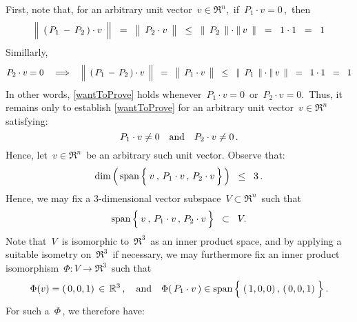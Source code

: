 First, note that, for an arbitrary unit vector \,$v \in \Re^{n}$,\,
if \,$P_{1} \cdot v = 0$\,,\, then
\begin{equation*}
\left\Vert\;\, (\,P_{1} \,\overset{{\color{white}.}}{-}\, P_{2}\,)\cdot v \,\;\right\Vert
\;\; = \;\;
	\left\Vert\;\, P_{2} \overset{{\color{white}.}}{\cdot} v \,\;\right\Vert
\;\; \leq \;\;
	\left\Vert\;\, P_{2} \,\;\right\Vert
	\cdot
	\left\Vert\, v \,\;\right\Vert
\;\; = \;\;
	1 \cdot 1
\;\; = \;\;
	1
\end{equation*}
Simillarly,
\begin{equation*}
P_{2} \cdot v = 0
\quad\Longrightarrow\quad
\left\Vert\;\, (\,P_{1} \,\overset{{\color{white}.}}{-}\, P_{2}\,)\cdot v \,\;\right\Vert
\;\; = \;\;
	\left\Vert\;\, P_{1} \overset{{\color{white}.}}{\cdot} v \,\;\right\Vert
\;\; \leq \;\;
	\left\Vert\;\, P_{1} \,\;\right\Vert
	\cdot
	\left\Vert\, v \,\;\right\Vert
\;\; = \;\;
	1 \cdot 1
\;\; = \;\;
	1
\end{equation*}
In other words, \eqref{wantToProve} holds whenever
\,$P_{1}\cdot v = 0$\, or \,$P_{2}\cdot v = 0$.\,
Thus, it remains only to establish \eqref{wantToProve}
for an arbitrary unit vector \,$v \in \Re^{n}$\, satisfying:
\begin{equation}\label{caseAssumption}
P_{1} \cdot v \neq 0
\quad\textnormal{and}\quad
P_{2} \cdot v \neq 0\,.
\end{equation}
Hence, let \,$v \in \Re^{n}$\, be an arbitrary such unit vector.
Observe that:
\begin{equation*}
\dim\left(\,\span\left\{\,\overset{{\color{white}-}}{v} \,,\, P_{1}\cdot v \,,\, P_{2}\cdot v\,\right\}\,\right)
\;\; \leq \;\;
	3\,.
\end{equation*}
Hence, we may fix a $3$-dimensional vector subspace \,$V \subset \Re^{n}$\, such that
\begin{equation*}
\span\left\{\,\overset{{\color{white}-}}{v} \,,\, P_{1}\cdot v \,,\, P_{2}\cdot v\,\right\}
\;\; \subset \;\;
	V.
\end{equation*}
Note that \,$V$\, is isomorphic to \,$\Re^{3}$\, as an inner product space,
and by applying a suitable isometry on \,$\Re^{3}$\, if necessary,
we may furthermore fix an inner product isomorphism \,$\Phi : V \longrightarrow \Re^{3}$\,
such that
\begin{equation*}
\Phi(v) = (\,0,0,1) \,\in\, \Re^{3}\,,
\quad\textnormal{and}\quad
\Phi(\,P_{1}\cdot v\,) \in \span\left\{\;(\,\overset{{\color{white}.}}{1},0,0) \,,\, (\,0,0,1)\;\right\}.
\end{equation*}
For such a \,$\Phi$\,, we therefore have:
